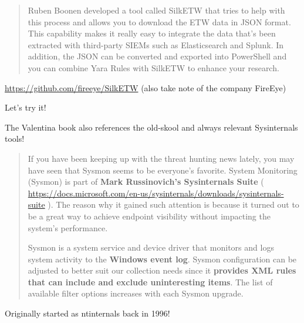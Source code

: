 \documentclass[Screen16to9,17pt]{foils}
\begin{document}

\begin{quote}
Ruben Boonen developed a tool called SilkETW that tries to help with this process and
allows you to download the ETW data in JSON format. This capability makes it really easy
to integrate the data that's been extracted with third-party SIEMs such as Elasticsearch
and Splunk. In addition, the JSON can be converted and exported into PowerShell and
you can combine Yara Rules with SilkETW to enhance your research.
\end{quote}

\begin{list2}
\item \url{https://github.com/fireeye/SilkETW} (also take note of the company FireEye)
\item Let's try it!
\end{list2}


The Valentina book also references the old-skool and always relevant Sysinternals tools!
\begin{quote}
If you have been keeping up with the threat hunting news lately, you may have seen that Sysmon seems to be everyone's favorite. System Monitoring (Sysmon) is part of {\bf Mark Russinovich's Sysinternals Suite} ( \url{https://docs.microsoft.com/en-us/sysinternals/downloads/sysinternals-suite} ). The reason why it gained such attention is because it turned out to be a great way to achieve endpoint visibility without impacting the system's performance.

Sysmon is a system service and device driver that monitors and logs system activity to
the {\bf Windows event log}. Sysmon configuration can be adjusted to better suit our collection
needs since it {\bf provides XML rules that can include and exclude uninteresting items}. The
list of available filter options increases with each Sysmon upgrade.
\end{quote}

\begin{list2}
\item Originally started as ntinternals back in 1996!
\end{list2}


\end{document}
